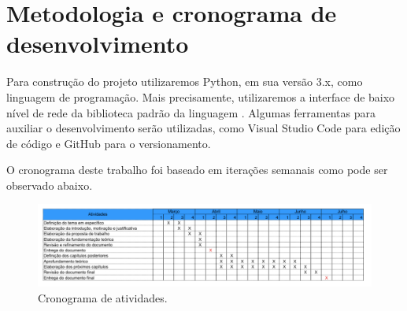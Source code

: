 \chapter{\label{chap:chap4} Metodologia e cronograma de desenvolvimento}
Para construção do projeto utilizaremos Python\cite{python}, em sua versão 3.x, como linguagem de programação.
Mais precisamente, utilizaremos a interface de baixo nível de rede da biblioteca padrão da linguagem \cite{socketPython}.
Algumas ferramentas para auxiliar o desenvolvimento serão utilizadas, como Visual Studio Code\cite{vscode} para edição de código e GitHub\cite{github} para o versionamento.

O cronograma deste trabalho foi baseado em iterações semanais como pode ser observado abaixo.
\begin{figure}[htb!]
    \centering\includegraphics[width=1\textwidth]{fig3.pdf}
    \caption%
    {\label{fig:fig3} Cronograma de atividades.}
\end{figure}



